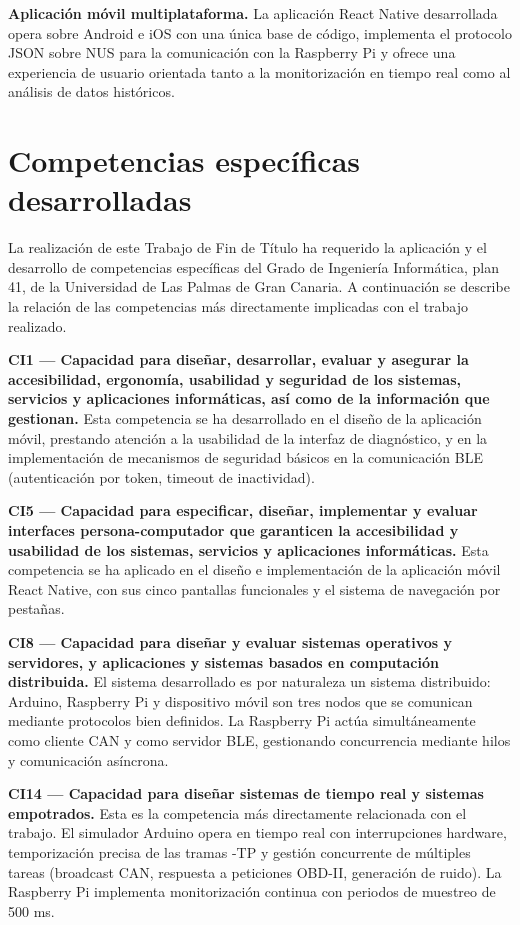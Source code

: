 \textbf{Aplicación móvil multiplataforma.} La aplicación React Native desarrollada opera sobre Android e iOS con una única base de código, implementa el protocolo JSON sobre NUS para la comunicación con la Raspberry Pi y ofrece una experiencia de usuario orientada tanto a la monitorización en tiempo real como al análisis de datos históricos.

\section{Competencias específicas desarrolladas}

La realización de este Trabajo de Fin de Título ha requerido la aplicación y el desarrollo de competencias específicas del Grado de Ingeniería Informática, plan 41, de la Universidad de Las Palmas de Gran Canaria. A continuación se describe la relación de las competencias más directamente implicadas con el trabajo realizado.

\textbf{CI1 — Capacidad para diseñar, desarrollar, evaluar y asegurar la accesibilidad, ergonomía, usabilidad y seguridad de los sistemas, servicios y aplicaciones informáticas, así como de la información que gestionan.} Esta competencia se ha desarrollado en el diseño de la aplicación móvil, prestando atención a la usabilidad de la interfaz de diagnóstico, y en la implementación de mecanismos de seguridad básicos en la comunicación BLE (autenticación por token, timeout de inactividad).

\textbf{CI5 — Capacidad para especificar, diseñar, implementar y evaluar interfaces persona-computador que garanticen la accesibilidad y usabilidad de los sistemas, servicios y aplicaciones informáticas.} Esta competencia se ha aplicado en el diseño e implementación de la aplicación móvil React Native, con sus cinco pantallas funcionales y el sistema de navegación por pestañas.

\textbf{CI8 — Capacidad para diseñar y evaluar sistemas operativos y servidores, y aplicaciones y sistemas basados en computación distribuida.} El sistema desarrollado es por naturaleza un sistema distribuido: Arduino, Raspberry Pi y dispositivo móvil son tres nodos que se comunican mediante protocolos bien definidos. La Raspberry Pi actúa simultáneamente como cliente CAN y como servidor BLE, gestionando concurrencia mediante hilos y comunicación asíncrona.

\textbf{CI14 — Capacidad para diseñar sistemas de tiempo real y sistemas empotrados.} Esta es la competencia más directamente relacionada con el trabajo. El simulador Arduino opera en tiempo real con interrupciones hardware, temporización precisa de las tramas -TP y gestión concurrente de múltiples tareas (broadcast CAN, respuesta a peticiones OBD-II, generación de ruido). La Raspberry Pi implementa monitorización continua con periodos de muestreo de 500 ms.

